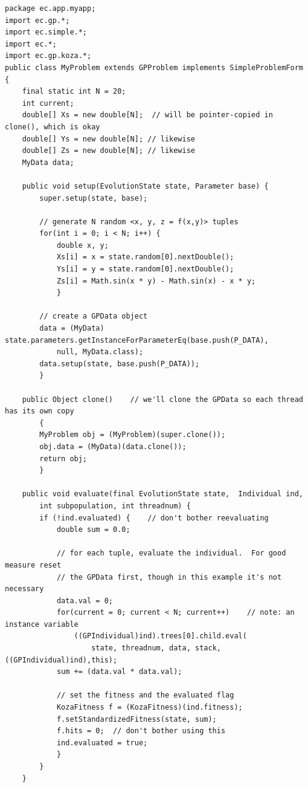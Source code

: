 \documentclass[twoside,10pt]{book}
\begin{document}
{\small
\begin{verbatim}
package ec.app.myapp;
import ec.gp.*;
import ec.simple.*;
import ec.*;
import ec.gp.koza.*;
public class MyProblem extends GPProblem implements SimpleProblemForm {
    final static int N = 20;
    int current;
    double[] Xs = new double[N];  // will be pointer-copied in clone(), which is okay
    double[] Ys = new double[N]; // likewise
    double[] Zs = new double[N]; // likewise
    MyData data;
	
    public void setup(EvolutionState state, Parameter base) {
        super.setup(state, base);

        // generate N random <x, y, z = f(x,y)> tuples
        for(int i = 0; i < N; i++) {
            double x, y;
            Xs[i] = x = state.random[0].nextDouble();
            Ys[i] = y = state.random[0].nextDouble();
            Zs[i] = Math.sin(x * y) - Math.sin(x) - x * y;
            }
	
        // create a GPData object
        data = (MyData) state.parameters.getInstanceForParameterEq(base.push(P_DATA),
            null, MyData.class);
        data.setup(state, base.push(P_DATA));
        }
	
    public Object clone()    // we'll clone the GPData so each thread has its own copy
        {
        MyProblem obj = (MyProblem)(super.clone());
        obj.data = (MyData)(data.clone());
        return obj;
        }

    public void evaluate(final EvolutionState state,  Individual ind, 
        int subpopulation, int threadnum) {
        if (!ind.evaluated) {    // don't bother reevaluating
            double sum = 0.0;
            
            // for each tuple, evaluate the individual.  For good measure reset
            // the GPData first, though in this example it's not necessary
            data.val = 0;
            for(current = 0; current < N; current++)    // note: an instance variable
                ((GPIndividual)ind).trees[0].child.eval(
                    state, threadnum, data, stack, ((GPIndividual)ind),this);
            sum += (data.val * data.val);
            
            // set the fitness and the evaluated flag
            KozaFitness f = (KozaFitness)(ind.fitness);
            f.setStandardizedFitness(state, sum);
            f.hits = 0;  // don't bother using this
            ind.evaluated = true;
            }
        }
    }
\end{verbatim}
}
\end{document}

